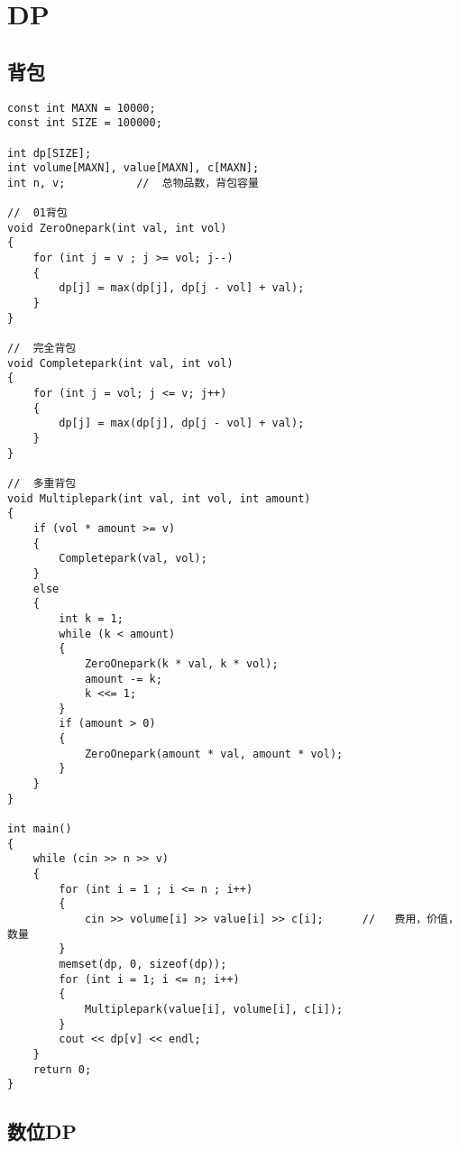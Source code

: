 \section{DP}
\subsection{背包}
\begin{lstlisting}
const int MAXN = 10000;
const int SIZE = 100000;

int dp[SIZE];
int volume[MAXN], value[MAXN], c[MAXN];
int n, v;           //  总物品数，背包容量

//  01背包
void ZeroOnepark(int val, int vol)
{
	for (int j = v ; j >= vol; j--)
	{
		dp[j] = max(dp[j], dp[j - vol] + val);
	}
}

//  完全背包
void Completepark(int val, int vol)
{
	for (int j = vol; j <= v; j++)
	{
		dp[j] = max(dp[j], dp[j - vol] + val);
	}
}

//  多重背包
void Multiplepark(int val, int vol, int amount)
{
	if (vol * amount >= v)
	{
		Completepark(val, vol);
	}
	else
	{
		int k = 1;
		while (k < amount)
		{
			ZeroOnepark(k * val, k * vol);
			amount -= k;
			k <<= 1;
		}
		if (amount > 0)
		{
			ZeroOnepark(amount * val, amount * vol);
		}
	}
}

int main()
{
	while (cin >> n >> v)
	{
		for (int i = 1 ; i <= n ; i++)
		{
			cin >> volume[i] >> value[i] >> c[i];      //   费用，价值，数量
		}
		memset(dp, 0, sizeof(dp));
		for (int i = 1; i <= n; i++)
		{
			Multiplepark(value[i], volume[i], c[i]);  
		}
		cout << dp[v] << endl;
	}
	return 0;
}
\end{lstlisting}


\subsection{数位DP}
